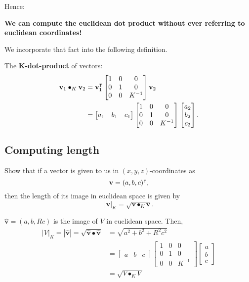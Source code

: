 \documentclass[newpage,hints,handout]{ximera}
\begin{document}
Hence:
\begin{center}
\textbf{We can compute the euclidean dot product without ever referring to euclidean coordinates!}
\end{center}
We incorporate that fact into the following definition.

\begin{definition}
The \textbf{$\boldsymbol{K}$-dot-product} of vectors:%
\begin{align*}
\mathbf{v}_{1}\bullet_{K}\mathbf{v}_{2}  &=\mathbf{v}_{1}^\transpose
\begin{bmatrix}
1 & 0 & 0\\
0 & 1 & 0\\
0 & 0 & K^{-1}%
\end{bmatrix}
\mathbf{v}_{2}\\
&=
\begin{bmatrix}
a_{1} & b_{1} & c_{1}%
\end{bmatrix}
\begin{bmatrix}
1 & 0 & 0\\
0 & 1 & 0\\
0 & 0 & K^{-1}%
\end{bmatrix}
\begin{bmatrix}
a_{2}\\
b_{2}\\
c_{2}%
\end{bmatrix}.
\end{align*}

\end{definition}

\subsection{Computing length}

\begin{problem}
  Show that if a vector is given to us in $(x,y,z)$-coordinates as%
\[
\mathbf{v}=(a,b,c)^\intercal,
\]
then the length of its image in euclidean space is given by
\[
|\mathbf{v}|_K=\sqrt{\mathbf{v} \bullet_K \mathbf{v}}.
\]

\begin{freeResponse}
$\hat{\mathbf v} = \left(a,b,Rc \right)$ is the image of $V$ in euclidean space. Then,
\begin{align*}
|V|_K = |\hat{\mathbf v}| = \sqrt{\hat{\mathbf v}\bullet\hat{\mathbf v}} 
&= \sqrt{a^{2} + b^{2} + R^{2}c^{2}} \\
&= \begin{bmatrix}
a & b & c%
\end{bmatrix}
\begin{bmatrix}
1 & 0 & 0\\
0 & 1 & 0\\
0 & 0 & K^{-1}%
\end{bmatrix}
\begin{bmatrix}
a\\
b\\
c%
\end{bmatrix} \\
&= \sqrt{V\bullet_K V}
\end{align*}
\end{freeResponse} 
\end{problem}
\end{document}
